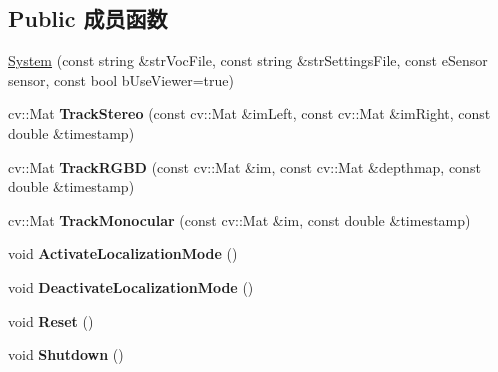 \subsection*{Public 成员函数}
\begin{DoxyCompactItemize}
\item 
\hyperlink{classORB__SLAM2_1_1System_a687bbabebe054f6d40b44b1ba64bc57a}{System} (const string \&str\-Voc\-File, const string \&str\-Settings\-File, const e\-Sensor sensor, const bool b\-Use\-Viewer=true)
\item 
\hypertarget{classORB__SLAM2_1_1System_a61226615f8d33afee19bb4ca188cc021}{cv\-::\-Mat {\bfseries Track\-Stereo} (const cv\-::\-Mat \&im\-Left, const cv\-::\-Mat \&im\-Right, const double \&timestamp)}\label{classORB__SLAM2_1_1System_a61226615f8d33afee19bb4ca188cc021}

\item 
\hypertarget{classORB__SLAM2_1_1System_a3b5be10e71c3484c11171bca16cdcd8e}{cv\-::\-Mat {\bfseries Track\-R\-G\-B\-D} (const cv\-::\-Mat \&im, const cv\-::\-Mat \&depthmap, const double \&timestamp)}\label{classORB__SLAM2_1_1System_a3b5be10e71c3484c11171bca16cdcd8e}

\item 
\hypertarget{classORB__SLAM2_1_1System_a0408659bafa31c4d0722ccd032fb9430}{cv\-::\-Mat {\bfseries Track\-Monocular} (const cv\-::\-Mat \&im, const double \&timestamp)}\label{classORB__SLAM2_1_1System_a0408659bafa31c4d0722ccd032fb9430}

\item 
\hypertarget{classORB__SLAM2_1_1System_a6cd39ec31a23d7ba5ebe1a6e4f4a0f89}{void {\bfseries Activate\-Localization\-Mode} ()}\label{classORB__SLAM2_1_1System_a6cd39ec31a23d7ba5ebe1a6e4f4a0f89}

\item 
\hypertarget{classORB__SLAM2_1_1System_a3bb91bfb9547b01596dac3e9fdd4adfd}{void {\bfseries Deactivate\-Localization\-Mode} ()}\label{classORB__SLAM2_1_1System_a3bb91bfb9547b01596dac3e9fdd4adfd}

\item 
\hypertarget{classORB__SLAM2_1_1System_a33f5eb6f33d14cdda2a889fe06d6619e}{void {\bfseries Reset} ()}\label{classORB__SLAM2_1_1System_a33f5eb6f33d14cdda2a889fe06d6619e}

\item 
\hypertarget{classORB__SLAM2_1_1System_aa934876a230dfa99e123f62b4b54d0cb}{void {\bfseries Shutdown} ()}\label{classORB__SLAM2_1_1System_aa934876a230dfa99e123f62b4b54d0cb}


\end{DoxyCompactItemize}
